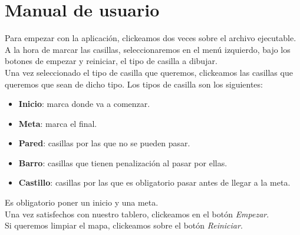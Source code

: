 \documentclass[12pt]{article}
\begin{document}
\section{Manual de usuario}
Para empezar con la aplicación, clickeamos dos veces sobre el archivo ejecutable.\\
A la hora de marcar las casillas, seleccionaremos en el menú izquierdo, bajo los botones de empezar y reiniciar, el tipo de casilla a dibujar.\\
Una vez seleccionado el tipo de casilla que queremos, clickeamos las casillas que queremos que sean de dicho tipo. Los tipos de casilla son los siguientes:\\
\begin{itemize}
    \item \textbf{Inicio}: marca donde va a comenzar.
    \item \textbf{Meta}: marca el final.
    \item \textbf{Pared}: casillas por las que no se pueden pasar.
    \item \textbf{Barro}: casillas que tienen penalización al pasar por ellas.
    \item \textbf{Castillo}: casillas por las que es obligatorio pasar antes de llegar a la meta.
\end{itemize}
Es obligatorio poner un inicio y una meta.\\
Una vez satisfechos con nuestro tablero, clickeamos en el botón \textit{Empezar}.\\
Si queremos limpiar el mapa, clickeamos sobre el botón \textit{Reiniciar}.
\end{document}
